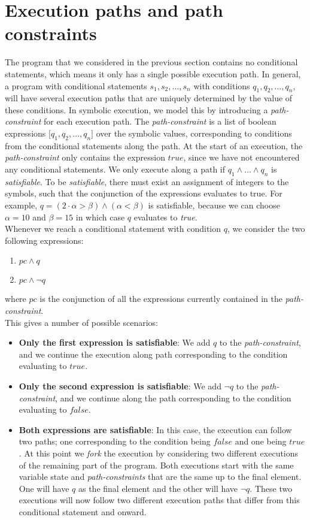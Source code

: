 \section{Execution paths and path constraints}
		The program that we considered in the previous section contains no conditional statements, which means it only has a single possible execution path. In general, a program with conditional statements $s_1, s_2, \ldots, s_n$ with conditions $q_1, q_2, \ldots, q_n$, will have several execution paths that are uniquely determined by the value of these conditions. In symbolic execution, we model this by introducing a \emph{path-constraint} for each execution path. The \emph{path-constraint} is a list of boolean expressions $\lbrack q_1, q_2, \ldots, q_n \rbrack$ over the symbolic values, corresponding to conditions from the conditional statements along the path. At the start of an execution, the \emph{path-constraint} only contains the expression $true$, since we have not encountered any conditional statements. We only execute along a path if $q_1 \land \ldots \land q_n$ is \emph{satisfiable}. To be \emph{satisfiable}, there must exist an assignment of integers to the symbols, such that the conjunction of the expressions evaluates to true. For example, $q = (2\cdot \alpha > \beta) \land (\alpha < \beta)$ is satisfiable, because we can choose $\alpha = 10$ and $\beta = 15$ in which case $q$ evaluates to \emph{true}.
		\\ 
		Whenever we reach a conditional statement with condition $q$, we consider the two following expressions:
		

		\begin{enumerate}
			\item $ pc \land q$
			\item $ pc \land \neg q$
		\end{enumerate}	
		where $pc$ is the conjunction of all the expressions currently contained in the \emph{path-constraint}.
		\\
		This gives a number of possible scenarios:	
		\begin{itemize}
			\item \textbf{Only the first expression is satisfiable}: 
			We add $q$ to the \emph{path-constraint}, and we continue the execution along path corresponding to the condition evaluating to $true$.
			\item \textbf{Only the second expression is satisfiable}:
			We add $\neg q$ to the \emph{path-constraint}, and we continue along the path corresponding to the condition evaluating to $false$. 
			\item \textbf{Both expressions are satisfiable}: In this case, the execution can follow two paths; one corresponding to the condition being $false$ and one being $true$. At this point we \emph{fork} the execution by considering two different executions of the remaining part of the program. Both executions start with the same variable state and \emph{path-constraints} that are the same
			 up to the final element. One will have $q$ as the final element and the other will have $\neg q$. 
			These two executions will now follow two different execution paths that differ from this conditional statement and onward.
		\end{itemize}
		
